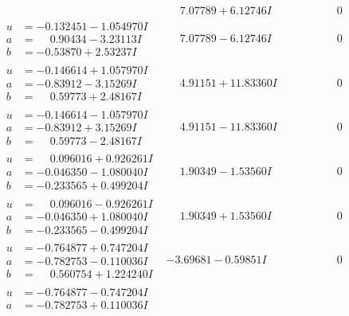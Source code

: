 \documentclass[1p]{elsarticle_modified}
\theoremstyle{definition}
\begin{document}
$$\begin{array}{c|c|c}
 & \phantom{-}7.07789 + 6.12746 I & \phantom{-0.000000 } 0 \\ \hline\begin{aligned}
u &= -0.132451 - 1.054970 I \\
a &= \phantom{-}0.90434 - 3.23113 I \\
b &= -0.53870 + 2.53237 I\end{aligned}
 & \phantom{-}7.07789 - 6.12746 I & \phantom{-0.000000 } 0 \\ \hline\begin{aligned}
u &= -0.146614 + 1.057970 I \\
a &= -0.83912 - 3.15269 I \\
b &= \phantom{-}0.59773 + 2.48167 I\end{aligned}
 & \phantom{-}4.91151 + 11.83360 I & \phantom{-0.000000 } 0 \\ \hline\begin{aligned}
u &= -0.146614 - 1.057970 I \\
a &= -0.83912 + 3.15269 I \\
b &= \phantom{-}0.59773 - 2.48167 I\end{aligned}
 & \phantom{-}4.91151 - 11.83360 I & \phantom{-0.000000 } 0 \\ \hline\begin{aligned}
u &= \phantom{-}0.096016 + 0.926261 I \\
a &= -0.046350 - 1.080040 I \\
b &= -0.233565 + 0.499204 I\end{aligned}
 & \phantom{-}1.90349 - 1.53560 I & \phantom{-0.000000 } 0 \\ \hline\begin{aligned}
u &= \phantom{-}0.096016 - 0.926261 I \\
a &= -0.046350 + 1.080040 I \\
b &= -0.233565 - 0.499204 I\end{aligned}
 & \phantom{-}1.90349 + 1.53560 I & \phantom{-0.000000 } 0 \\ \hline\begin{aligned}
u &= -0.764877 + 0.747204 I \\
a &= -0.782753 - 0.110036 I \\
b &= \phantom{-}0.560754 + 1.224240 I\end{aligned}
 & -3.69681 - 0.59851 I & \phantom{-0.000000 } 0 \\ \hline\begin{aligned}
u &= -0.764877 - 0.747204 I \\
a &= -0.782753 + 0.110036 I \\

\end{aligned}
\end{array}$$
\end{document}

